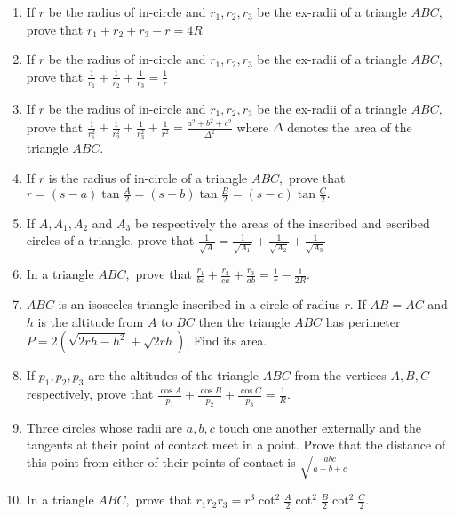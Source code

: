 \begin{enumerate}
\item If $r$ be the radius of in-circle and $r_1, r_2, r_3$ be the ex-radii of a triangle $ABC,$ prove that
   $r_1 + r_2 + r_3 - r = 4R$

\item If $r$ be the radius of in-circle and $r_1, r_2, r_3$ be the ex-radii of a triangle $ABC,$ prove that
   $\frac{1}{r_1} + \frac{1}{r_2} + \frac{1}{r_3} = \frac{1}{r}$

\item If $r$ be the radius of in-circle and $r_1, r_2, r_3$ be the ex-radii of a triangle $ABC,$ prove that
   $\frac{1}{r_1^2} + \frac{1}{r_2^2} + \frac{1}{r_3^2} + \frac{1}{r^2} = \frac{a^2 + b^2 + c^2}{\Delta^2}$ where
   $\Delta$ denotes the area of the triangle $ABC.$

\item If $r$ is the radius of in-circle of a triangle $ABC,$ prove that $r = (s - a)\tan\frac{A}{2} = (s -
   b)\tan\frac{B}{2} = (s - c)\tan\frac{C}{2}.$

\item If $A, A_1, A_2$ and $A_3$ be respectively the areas of the inscribed and escribed circles of a triangle, prove that
   $\frac{1}{\sqrt{A}} = \frac{1}{\sqrt{A_1}} + \frac{1}{\sqrt{A_2}} + \frac{1}{\sqrt{A_3}}$

\item In a triangle $ABC,$ prove that $\frac{r_1}{bc} + \frac{r_2}{ca} + \frac{r_3}{ab} = \frac{1}{r} - \frac{1}{2R}.$

\item $ABC$ is an isosceles triangle inscribed in a circle of radius $r.$ If $AB = AC$ and $h$ is the altitude
   from $A$ to $BC$ then the triangle $ABC$ has perimeter $P = 2(\sqrt{2rh - h^2} + \sqrt{2rh}).$ Find its
   area.

\item If $p_1, p_2, p_3$ are the altitudes of the triangle $ABC$ from the vertices $A, B, C$ respectively, prove
   that $\frac{\cos A}{p_1} + \frac{\cos B}{p_2} + \frac{\cos C}{p_3} = \frac{1}{R}.$

\item Three circles whose radii are $a, b, c$ touch one another externally and the tangents at their point of contact meet in a
   point. Prove that the distance of this point from either of their points of contact is $\sqrt{\frac{abc}{a + b + c}}$

\item In a triangle $ABC,$ prove that $r_1r_2r_3 = r^3\cot^2\frac{A}{2}\cot^2\frac{B}{2}\cot^2\frac{C}{2}.$


\end{enumerate}
